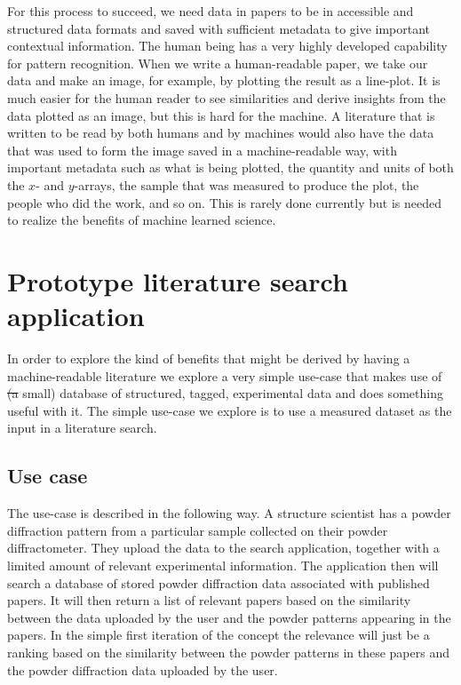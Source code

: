 \documentclass[preprint]{iucr}
\providecommand{\DIFadd}[1]{{\protect\color{blue}\uwave{#1}}} %
\providecommand{\DIFdel}[1]{{\protect\color{red}\sout{#1}}}                      %
\providecommand{\DIFaddbegin}{} %
\providecommand{\DIFaddend}{} %
\providecommand{\DIFdelbegin}{} %
\providecommand{\DIFdelend}{} %
\newcommand{\DIFscaledelfig}{0.5}
\newlength{\DIFdelgraphicswidth} %
\newlength{\DIFdelgraphicsheight} %
\newcommand{\DIFaddincludegraphics}[2][]{{\color{blue}\fbox{\DIFOincludegraphics[#1]{#2}}}} %
\newcommand{\DIFdelincludegraphics}[2][]{%
\sbox{\DIFdelgraphicsbox}{\DIFOincludegraphics[#1]{#2}}%
\settoboxwidth{\DIFdelgraphicswidth}{\DIFdelgraphicsbox} %
\settoboxtotalheight{\DIFdelgraphicsheight}{\DIFdelgraphicsbox} %
\scalebox{\DIFscaledelfig}{%
\parbox[b]{\DIFdelgraphicswidth}{\usebox{\DIFdelgraphicsbox}\\[-\baselineskip] \rule{\DIFdelgraphicswidth}{0em}}\llap{\resizebox{\DIFdelgraphicswidth}{\DIFdelgraphicsheight}{%
\setlength{\unitlength}{\DIFdelgraphicswidth}%
\begin{picture}(1,1)%
\thicklines\linethickness{2pt} %
{\color[rgb]{1,0,0}\put(0,0){\framebox(1,1){}}}%
{\color[rgb]{1,0,0}\put(0,0){\line( 1,1){1}}}%
{\color[rgb]{1,0,0}\put(0,1){\line(1,-1){1}}}%
\end{picture}%
}\hspace*{3pt}}} %
} %
\DeclareRobustCommand{\DIFaddbegin}{\DIFOaddbegin \let\includegraphics\DIFaddincludegraphics} %
\DeclareRobustCommand{\DIFaddend}{\DIFOaddend \let\includegraphics\DIFOincludegraphics} %
\DeclareRobustCommand{\DIFdelbegin}{\DIFOdelbegin \let\includegraphics\DIFdelincludegraphics} %
\DeclareRobustCommand{\DIFdelend}{\DIFOaddend \let\includegraphics\DIFOincludegraphics} %
\begin{document}
For this process to succeed, we need data in papers to be in accessible and structured data formats and saved with sufficient metadata to give important contextual information. The human being has a very highly developed capability for pattern recognition.  When we write a human-readable paper, we take our data and make an image, for example, by plotting the result as a line-plot.  It is much easier for the human reader to see similarities and derive insights from the data plotted as an image, but this is hard for the machine.  A literature that is written to be read by both humans and by machines would also have the data that was used to form the image saved in a machine-readable way, with important metadata such as what is being plotted, the quantity and units of both the $x$- and $y$-arrays, the sample that was measured to produce the plot, the people who did the work, and so on.  This is rarely done currently but is needed to realize the benefits of machine learned science.  

\section{Prototype literature search application}
In order to explore the kind of benefits that might be derived by having a machine-readable literature we explore a very simple use-case that makes use of \DIFdelbegin \DIFdel{(a }\DIFdelend \DIFaddbegin \DIFadd{a (}\DIFaddend small) database of structured, tagged, experimental data and does something useful with it.  The simple use-case we explore is to use a measured dataset as the input in a literature search.

\subsection{Use case}
\label{sec:uc}

The use-case is described in the following way.  A structure scientist has a powder diffraction pattern from a particular sample collected on their powder diffractometer. They upload the data to the search application, together with a limited amount of relevant experimental information. The application then will search a database of stored powder diffraction data associated with published papers. It will then return a list of relevant papers based on the similarity between the data uploaded by the user and the powder patterns appearing in the papers. In the simple first iteration of the concept the relevance will just be a ranking based on the similarity between the powder patterns in these papers and the powder diffraction data uploaded by the user.
\end{document}
